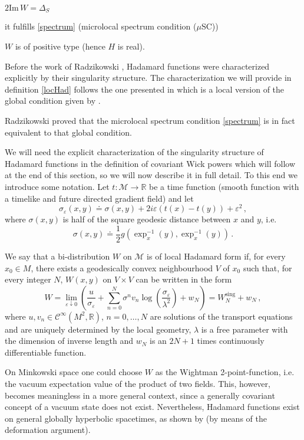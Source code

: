 \documentclass[12pt]{article}
\newcommand{\Mcal}{\mathcal{M}}
\newcommand{\Ci}{\mathcal{C}^\infty} %
\newcommand{\RR}{\mathbb{R}}           %
\newcommand{\la}{\lambda}
\newcommand{\sst}[1]{\scriptscriptstyle{#1}}  %
\newcommand{\minus}{\sst{-1}}   %
\newcommand{\1}{\mathds{1}}                         %
\newcommand{\be}{\begin{equation}}
\newcommand{\ee}{\end{equation}}
\begin{document}
{\begin{df}
\begin{enumerate}
{\item \label{im} $2\mathrm{Im}\,W=\Delta_S$}

{\item it fulfills \eqref{spectrum} (microlocal spectrum condition ($\mu$SC))}

{\item \label{pos} $W$ is of positive type (hence $H$ is real).}
\end{enumerate}
\end{df}
Before the work of Radzikowski \cite{Rad}, Hadamard functions were characterized explicitly by their singularity structure. The characterization we will provide in definition \ref{locHad} follows the one presented in \cite{Hack} which is a local version of the global condition given by \cite{KW91}. {Radzikowski proved that the microlocal spectrum condition  \eqref{spectrum} is in fact equivalent to that global condition. 

We will need the explicit characterization of the singularity structure of Hadamard functions in the definition of covariant Wick powers which will follow at the end of this section, so we will now describe it in full detail. To this end we introduce some notation. Let $t:\Mcal\rightarrow\RR$ be a time function (smooth function with a timelike and future directed gradient field) and let
\[
\sigma_\varepsilon(x,y)\doteq \sigma(x,y)+2i\varepsilon(t(x)-t(y))+\varepsilon^2\,,
\]
where $\sigma(x,y)$ is half of the square geodesic distance between $x$ and $y$, i.e. 
\[
\sigma(x,y)\doteq \frac{1}{2}g(\exp_x^{\minus}(y),\exp_x^{\minus}(y))\,.
\]
\begin{df}\label{locHad}
We say that a bi-distribution $W$ on $\Mcal$ is of local Hadamard form if, for every $x_0\in M$, there exists a geodesically convex neighbourhood $V$ of $x_0$ such that, for every integer $N$, $W(x,y)$ on $V\times V$ can be written in the form
\be\label{Hadform}
W=\lim_{\varepsilon\downarrow0}\left(\frac{u}{\sigma_\varepsilon}+\sum_{n=0}^N\sigma^nv_n\log\left(\frac{\sigma_\varepsilon}{\la^2}\right)+w_N\right)=W_{N}^{\textrm{sing}}+w_N\,,
\ee
where $u, v_n \in\Ci(M^2,\RR)$, $n=0,\ldots,N$ are solutions of the transport equations and are uniquely determined by the local geometry, $\la$ is a free parameter with the dimension of inverse length and $w_N$ is an $2N + 1$ times continuously
differentiable function.
\end{df}

 On Minkowski space one could choose $W$ as the  Wightman 2-point-function, i.e. the vacuum expectation value of the product of two fields. This, however, becomes meaningless in a more general context, since a generally covariant concept of a vacuum state does not exist. Nevertheless, Hadamard functions exist on general globally hyperbolic spacetimes, as shown by \cite{FNW} (by means of the deformation argument).
 
}}
\end{document}
